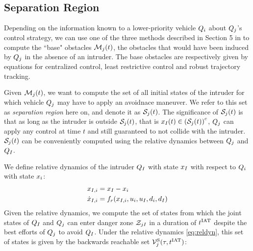 \subsection{Separation Region} \label{sec:sepRegion}
Depending on the information known to a lower-priority vehicle $Q_i$ about $Q_j$'s control strategy, we can use one of the three methods described in Section 5 in  to compute the ``base" obstacles $\mathcal{M}_j(t)$, the obstacles that would have been induced by $Q_j$ in the absence of an intruder. The base obstacles are respectively given by equations  for centralized control, least restrictive control and robust trajectory tracking.

Given $\mathcal{M}_j(t)$, we want to compute the set of all initial states of the intruder for which vehicle $Q_j$ may have to apply an avoidnace maneuver. We refer to this set as \textit{separation region} here on, and denote it as $\mathcal{S}_j(t)$. The significance of $\mathcal{S}_j(t)$ is that as long as the intruder is outside $\mathcal{S}_j(t)$, that is $x_{I}(t) \in \left(\mathcal{S}_j(t)\right)^c$, $Q_j$ can apply any control at time $t$ and still guaranteed to not collide with the intruder. $\mathcal{S}_j(t)$ can be conveniently computed using the relative dynamics between $Q_j$ and $Q_{I}$. 

We define relative dynamics of the intruder $Q_{I}$ with state $x_I$ with respect to $Q_i$ with state $x_i$:
\begin{equation}
\label{eq:reldyn}
\begin{aligned}
\state_{\intr, i} &= \state_\intr - \state_i \\
\dot \state_{\intr, i} &= f_r(\state_{\intr, i}, \ctrl_i, \ctrl_\intr, \dstb_i, \dstb_\intr)
\end{aligned}
\end{equation}
Given the relative dynamics, we compute the set of states from which the joint states of $Q_{I}$ and $Q_{j}$ can enter danger zone $\mathcal{Z}_{jI}$ in a duration of $t^\text{IAT}$ despite the best efforts of $Q_j$ to avoid $Q_{I}$. Under the relative dynamics \eqref{eq:reldyn}, this set of states is given by the backwards reachable set $\mathcal{V}^{\text{S}}_j(\tau, t^\text{IAT})$:


